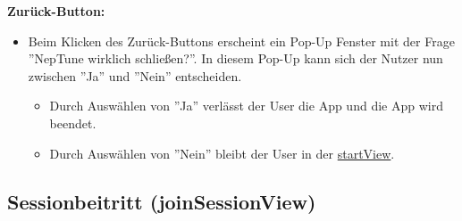 \documentclass[oneside, ngerman]{sdqtechreport}
\begin{document}
\textbf{Zurück-Button:}
\begin{itemize}
    \item Beim Klicken des Zurück-Buttons erscheint ein Pop-Up Fenster mit der Frage ''NepTune wirklich schließen?''. In diesem Pop-Up kann sich der Nutzer nun zwischen ''Ja'' und ''Nein'' entscheiden.
    \begin{itemize}
        \item Durch Auswählen von ''Ja'' verlässt der User die App und die App wird beendet.
        \item Durch Auswählen von ''Nein'' bleibt der User in der \hyperlink{startView}{startView}.
    \end{itemize}
\end{itemize}


\newpage

\subsection{Sessionbeitritt (joinSessionView)}
\label{sec:Benutzeroberfläche:joinSessionView}
\end{document}
